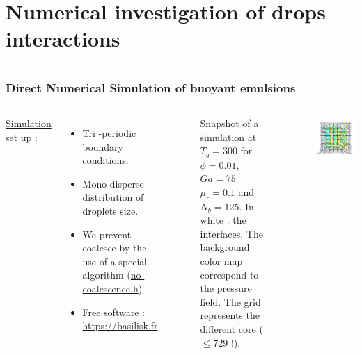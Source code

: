 \documentclass{sintefbeamer}
\begin{document}
\section{Numerical investigation of drops interactions}

\section*{}
\begin{frame}
\frametitle{Direct Numerical Simulation of buoyant emulsions}
\begin{columns}
\underline{Simulation set up :} 
\begin{itemize}
  \item Tri -periodic boundary conditions. 
  \item Mono-disperse distribution of droplets size.
  \item We prevent coalesce by the use of a special algorithm 
  (\href{http://basilisk.fr/sandbox/fintzin/Rising-Suspension/no-coalescence.h}{no-coalescence.h})
  \item Free software : \url{https://basilisk.fr}
\end{itemize}

\begin{figure}
  \caption{Snapshot of a simulation at $T_g = 300$ for $\phi = 0.01$, $Ga = 75$ $\mu_r = 0.1$ and $N_b = 125$. In white : the interfaces, The background color map correspond to the pressure field. The grid represents the different core ($\le 729$ !).
  }
\end{figure}
\centering
\includegraphics[width =  1.1\textwidth]{image/PHI_01_Ga_75.png}
\end{columns}
\end{frame}
\end{document}
